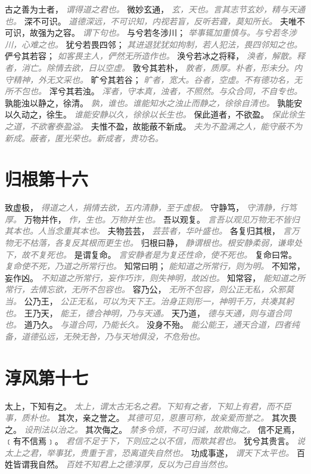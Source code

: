 \documentclass[a4paper,zihao=-4,oneside,landscape,UTF8]{ctexart}
\newcommand{\zhushi}[1]{\scriptsize{\textit{\textcolor{gray}{#1}}}\normalsize}
\begin{document}
古之善为士者，
\zhushi{谓得道之君也。}
微妙玄通，
\zhushi{玄，天也。言其志节玄妙，精与天通也。}
深不可识。
\zhushi{道德深远，不可识知，内视若盲，反听若聋，莫知所长。}
夫唯不可识，故强为之容。
\zhushi{谓下句也。}
与兮若冬涉川；
\zhushi{举事辄加重慎与。与兮若冬涉川，心难之也。}
犹兮若畏四邻；
\zhushi{其进退犹犹如拘制，若人犯法，畏四邻知之也。}
俨兮其若容；
\zhushi{如客畏主人，俨然无所造作也。}
涣兮若冰之将释，
\zhushi{涣者，解散。释者，消亡。除情去欲，日以空虚。}
敦兮其若朴，
\zhushi{敦者，质厚。朴者，形未分。内守精神，外无文采也。}
旷兮其若谷；
\zhushi{旷者，宽大。谷者，空虚。不有德功名，无所不包也。}
浑兮其若浊。
\zhushi{浑者，守本真，浊者，不照然。与众合同，不自专也。}
孰能浊以静之，徐清。
\zhushi{孰，谁也。谁能知水之浊止而静之，徐徐自清也。}
孰能安以久动之，徐生。
\zhushi{谁能安静以久，徐徐以长生也。}
保此道者，不欲盈。
\zhushi{保此徐生之道，不欲奢泰盈溢。}
夫惟不盈，故能蔽不新成。
\zhushi{夫为不盈满之人，能守蔽不为新成。蔽者，匿光荣也。新成者，贵功名。}


\section{归根第十六}

致虚极，
\zhushi{得道之人，捐情去欲，五内清静，至于虚极。}
守静笃，
\zhushi{守清静，行笃厚。}
万物并作，
\zhushi{作，生也。万物并生也。}
吾以观复。
\zhushi{言吾以观见万物无不皆归其本也。人当念重其本也。}
夫物芸芸，
\zhushi{芸芸者，华叶盛也。}
各复归其根，
\zhushi{言万物无不枯落，各复反其根而更生也。}
归根曰静，
\zhushi{静谓根也。根安静柔弱，谦卑处下，故不复死也。}
是谓复命。
\zhushi{言安静者是为复还性命，使不死也。}
复命曰常。
\zhushi{复命使不死，乃道之所常行也。}
知常曰明；
\zhushi{能知道之所常行，则为明。}
不知常，妄作凶。
\zhushi{不知道之所常行，妄作巧诈，则失神明，故凶也。}
知常容，
\zhushi{能知道之所常行，去情忘欲，无所不包容也。}
容乃公，
\zhushi{无所不包容，则公正无私，众邪莫当。}
公乃王，
\zhushi{公正无私，可以为天下王。治身正则形一，神明千万，共凑其躬也。}
王乃天，
\zhushi{能王，德合神明，乃与天通。}
天乃道，
\zhushi{德与天通，则与道合同也。}
道乃久。
\zhushi{与道合同，乃能长久。}
没身不殆。
\zhushi{能公能王，通天合道，四者纯备，道德弘远，无殃无咎，乃与天地俱没，不危殆也。}


\section{淳风第十七}

太上，下知有之。
\zhushi{太上，谓太古无名之君。下知有之者，下知上有君，而不臣事，质朴也。}
其次，亲之誉之。
\zhushi{其德可见，恩惠可称，故亲爱而誉之。}
其次畏之。
\zhushi{设刑法以治之。}
其次侮之。
\zhushi{禁多令烦，不可归诚，故欺侮之。}
信不足焉，﹝有不信焉﹞。
\zhushi{君信不足于下，下则应之以不信，而欺其君也。}
犹兮其贵言。
\zhushi{说太上之君，举事犹，贵重于言，恐离道失自然也。}
功成事遂，
\zhushi{谓天下太平也。}
百姓皆谓我自然。
\zhushi{百姓不知君上之德淳厚，反以为己自当然也。}
\end{document}
